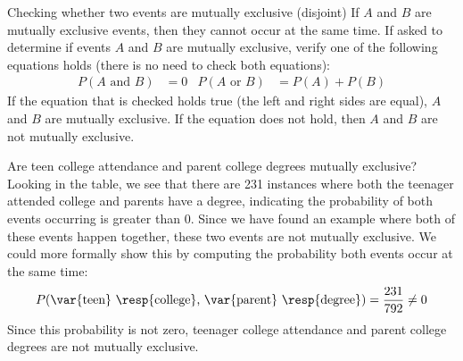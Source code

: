 \D{\newpage}

\begin{onebox}{Checking whether two events are mutually exclusive (disjoint)}
If $A$ and $B$ are mutually exclusive events, then they cannot occur at the same time. If asked to determine if events $A$ and $B$ are mutually exclusive, verify one of the following equations holds (there is no need to check both equations):
\begin{align*}
P(A \text{ and }B) &= 0&
P(A\text{ or }B) &= P(A) + P(B)
\end{align*}
If the equation that is checked holds true (the left and right sides are equal), $A$ and $B$ are mutually exclusive. If the equation does not hold, then $A$ and $B$ are not mutually exclusive.\end{onebox}


\begin{examplewrap}
\begin{nexample}{Are teen college attendance and parent college degrees mutually exclusive?}
Looking in the table, we see that there are 231 instances where both the teenager attended college and parents have a degree, indicating the probability of both events occurring is greater than 0. Since we have found an example where both of these events happen together, these two events are not mutually exclusive. We could more formally show this by computing the probability both events occur at the same time:
\begin{align*}
P(\text{\var{teen} \resp{college}, \var{parent} \resp{degree}}) = \frac{231}{792}\neq 0
\end{align*}
Since this probability is not zero, teenager college attendance and parent college degrees are not mutually exclusive.
\end{nexample}
\end{examplewrap}

